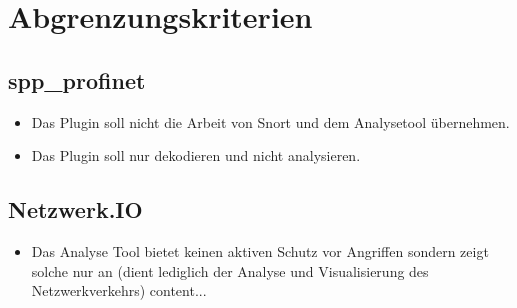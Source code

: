 \section{Abgrenzungskriterien}

\subsection{spp\_profinet}
\begin{itemize}
\item Das Plugin soll nicht die Arbeit von Snort und dem Analysetool übernehmen.

\item Das Plugin soll nur dekodieren und nicht analysieren.

\end{itemize}

\subsection{Netzwerk.IO}
\begin{itemize}

\item Das Analyse Tool bietet keinen aktiven Schutz vor Angriffen sondern zeigt solche nur an (dient lediglich der Analyse und Visualisierung des Netzwerkverkehrs)
content...
\end{itemize}